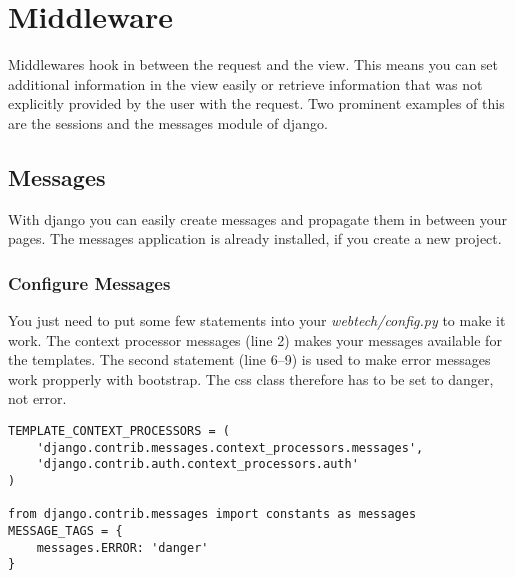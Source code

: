 \section{Middleware}
\label{sec:middleware}

Middlewares hook in between the request and the view. This means you can set additional information in the view easily or retrieve information that was not explicitly provided by the user with the request. Two prominent examples of this are the sessions and the messages module of django.

\subsection{Messages}

With django you can easily create messages and propagate them in between your pages. The messages application is already installed, if you create a new project.

\subsubsection{Configure Messages}
You just need to put some few statements into your \emph{webtech/config.py} to make it work. The context processor messages (line 2) makes your messages available for the templates. The second statement (line 6--9) is used to make error messages work propperly with bootstrap. The css class therefore has to be set to danger, not error.
\begin{lstlisting}[style=Python, caption=webtech/config.py, label=lst:config.py1]
TEMPLATE_CONTEXT_PROCESSORS = (
    'django.contrib.messages.context_processors.messages',
    'django.contrib.auth.context_processors.auth'
)

from django.contrib.messages import constants as messages
MESSAGE_TAGS = {
    messages.ERROR: 'danger'
}
\end{lstlisting}

